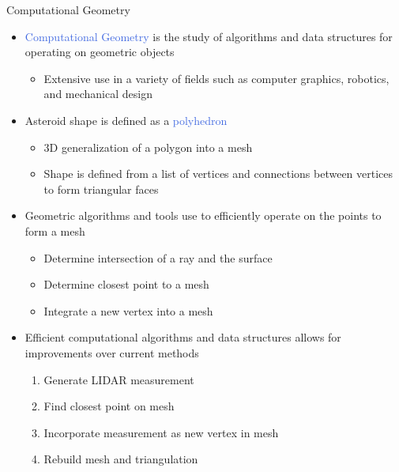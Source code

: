 \documentclass[final, usenames, dvipsnames]{beamer}
\newlength{\onecolwidth}
\def\Emph{\textcolor{RoyalBlue}}
\begin{document}
\begin{frame}[t]
\begin{columns}[T,onlytextwidth]
\begin{column}{\onecolwidth}
\begin{block}{Computational Geometry}
    \begin{itemize}
        \item \Emph{Computational Geometry} is the study of algorithms and data structures for operating on geometric objects
            \begin{itemize}
                \item Extensive use in a variety of fields such as computer graphics, robotics, and mechanical design
            \end{itemize}
        \item Asteroid shape is defined as a \Emph{polyhedron}
        \begin{itemize}
            \item 3D generalization of a polygon into a mesh
            \item Shape is defined from a list of vertices and connections between vertices to form triangular faces
        \end{itemize}
    \item Geometric algorithms and tools use to efficiently operate on the points to form a mesh
        \begin{itemize}
            \item Determine intersection of a ray and the surface
            \item Determine closest point to a mesh
            \item Integrate a new vertex into a mesh
        \end{itemize}
    \item Efficient computational algorithms and data structures allows for improvements over current methods
        \begin{enumerate}
            \item Generate LIDAR measurement
            \item Find closest point on mesh
            \item Incorporate measurement as new vertex in mesh
            \item Rebuild mesh and triangulation
        \end{enumerate}
    \end{itemize}


\end{block}
\end{column}
\end{columns}
\end{frame}
\end{document}
